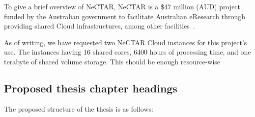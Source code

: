 \documentclass[a4paper,11pt]{article}
\begin{document}
To give a brief overview of NeCTAR, NeCTAR is a \$47 million (AUD) project funded by the Australian government to facilitate Australian eResearch through providing shared Cloud infrastructures, among other facilities~\cite{sinnott_towards_2011}.

As of writing, we have requested two NeCTAR Cloud instances for this project's use. The instances having 16 shared cores, 6400 hours of processing time, and one terabyte of shared volume storage. This should be enough resource-wise


\subsection{Proposed thesis chapter headings} %
\label{sub:proposed_thesis_chapter_headings}

The proposed structure of the thesis is as follows:
\end{document}
